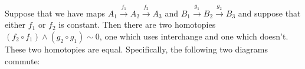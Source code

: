 \documentclass{article}
\newcommand{\lpmap}{\xrightarrow}
\newcommand{\smsh}{\wedge}
\renewcommand{\o}{\ensuremath{\circ}}
\begin{document}
\begin{lem}\label{lem:smash-coh}
  Suppose that we have maps $A_1\lpmap{f_1}A_2\lpmap{f_2}A_3$ and $B_1\lpmap{g_1}B_2\lpmap{g_2}B_3$
  and suppose that either $f_1$ or $f_2$ is constant. Then there are two homotopies
  $(f_2 \o f_1)\smsh (g_2 \o g_1)\sim 0$, one which uses interchange and one which doesn't. These two
  homotopies are equal. Specifically, the following two diagrams commute:
\begin{center}
\qquad
{}
\end{center}

\end{lem}
\end{document}
